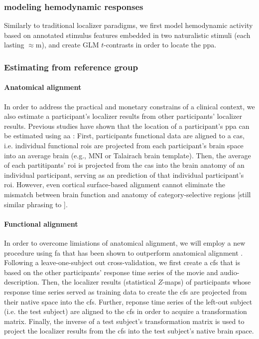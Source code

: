 \subsubsection{modeling hemodynamic responses}
%
Similarly to traditional localizer paradigms, we first model hemodynamic
activity based on annotated stimulus features embedded in two naturalistic
stimuli (each lasting $\approx$\unit[120]{m}), and create GLM $t$-contrasts in
order to locate the \ac{ppa}.


\subsubsection{Estimating from reference group}

\paragraph{Anatomical alignment}
In order to address the practical and monetary constrains of a clinical context,
we also estimate a participant's localizer results from other participants'
localizer results.
Previous studies have shown that the location of a participant's \ac{ppa} can be
estimated using \ac{aa} \citep{frost2012measuring, rosenke2021probabilistic,
weiner2018defining, zhen2017quantifying}:
%
First, participants functional data are aligned to a \ac{cas}, i.e. individual
functional \acp{roi} are projected from each participant's brain space into an
average brain (e.g., MNI or Talairach brain template).
%
Then, the average of each partitipants' \ac{roi} is projected from the \ac{cas}
into the brain anatomy of an individual participant, serving as an prediction of
that individual participant's \ac{roi}.
%
However, even cortical surface-based alignment \citep{fischl2012freesurfer}
cannot eliminate the mismatch between brain function and anatomy of
category-selective regions \citep{duncan2009consistency, frost2012measuring,
weiner2018defining, weiner2014mid} [still similar phrasing to
\citep{feilong2018reliable}].


\paragraph{Functional alignment}
In order to overcome limiations of anatomical alignment, we will employ a new
procedure using \ac{fa} that has been shown to outperform anatomical alignment
\citep{haxby2020hyperalignment, bazeille2021empirical}.
%
%
Following a leave-one-subject out cross-validation, we first create a \ac{cfs}
that is based on the other participants' response time series of the movie and
audio-description.
%
Then, the localizer results (statistical $Z$-maps) of participants whose
response time series served as training data to create the \ac{cfs} are
projected from their native space into the \ac{cfs}.
%
Further, reponse time series of the left-out subject (i.e. the test subject) are
aligned to the \ac{cfs} in order to acquire a transformation matrix.
%
Finally, the inverse of a test subject's transformation matrix is used to
project the localizer results from the \ac{cfs} into the test subject's native
brain space.


